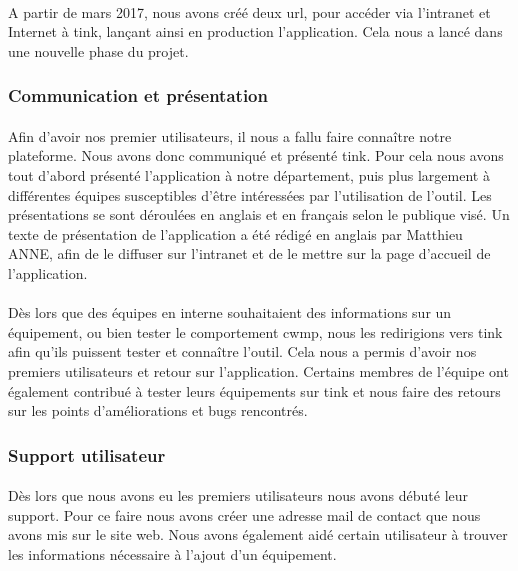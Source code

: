 \documentclass[12pt,a4paper]{report}
\begin{document}
\paragraph*{}A partir de mars 2017, nous avons créé deux \gls{url}, pour accéder via l'intranet et Internet à \gls{tink}, lançant ainsi en production l'application. Cela nous a lancé dans une nouvelle phase du projet. 
\subsubsection{Communication et présentation}
\paragraph*{}Afin d'avoir nos premier utilisateurs, il nous a fallu faire connaître notre plateforme. Nous avons donc communiqué et présenté \gls{tink}. Pour cela nous avons tout d'abord présenté l'application à notre département, puis plus largement à différentes équipes susceptibles d'être intéressées par l'utilisation de l'outil. Les présentations se sont déroulées en anglais et en français selon le publique visé. Un texte de présentation de l'application a été rédigé en anglais par Matthieu ANNE, afin de le diffuser sur l'intranet et de le mettre sur la page d'accueil de l'application. 
\paragraph*{}Dès lors que des équipes en interne souhaitaient des informations sur un équipement, ou bien tester le comportement \gls{cwmp}, nous les redirigions vers \gls{tink} afin qu'ils puissent tester et connaître l'outil. Cela nous a permis d'avoir nos premiers utilisateurs et retour sur l'application. Certains membres de l'équipe ont également contribué à tester leurs équipements sur \gls{tink} et nous faire des retours sur les points d'améliorations et bugs rencontrés. \\

\subsubsection{Support utilisateur}
\paragraph*{}Dès lors que nous avons eu les premiers utilisateurs nous avons débuté leur support. Pour ce faire nous avons créer une adresse mail de contact que nous avons mis sur le site web. Nous avons également aidé certain utilisateur à trouver les informations nécessaire à l'ajout d'un équipement.
\end{document}
